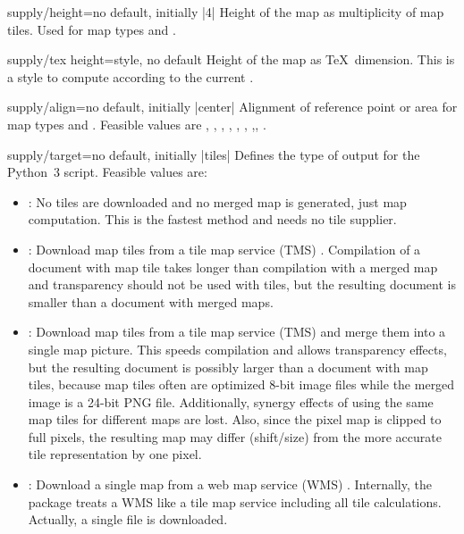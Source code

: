 \begin{docMrcKey}{supply/height}{=}{no default, initially |4|}
  Height of the map as multiplicity of map tiles.
  Used for map types  and .
\end{docMrcKey}

\begin{docMrcKey}{supply/tex height}{=}{style, no default}
  Height of the map as \TeX\ dimension.
  This is a style to compute  according to
  the current .
\end{docMrcKey}

\begin{docMrcKey}{supply/align}{=}{no default, initially |center|}
  Alignment of reference point or area for map types  and .
  Feasible values are
  , , , ,
  , , ,, .
\end{docMrcKey}

\begin{docMrcKey}{supply/target}{=}{no default, initially |tiles|}
  Defines the type of output for the Python~3 script. Feasible values are:
  \begin{itemize}
  \item{}: No tiles are downloaded and no merged map is generated, just map computation.
    This is the fastest method and needs no tile supplier.
  \item{}: Download map tiles from a tile map service (TMS) .
    Compilation of a document with map tile takes longer than compilation
    with a merged map and transparency should not be used with tiles,
    but the resulting document is smaller than a document with merged maps.
  \item{}: Download map tiles from a tile map service (TMS)
     and merge them into a single map picture.
    This speeds compilation and allows transparency effects, but
    the resulting document is possibly larger than a document with map tiles,
    because map tiles often are optimized 8-bit image files while the merged
    image is a 24-bit PNG file. Additionally, synergy effects of using the same map tiles
    for different maps are lost.
    Also, since the pixel map is clipped to full pixels, the resulting map
    may differ (shift/size) from the more accurate tile representation by
    one pixel.
  \item{}: Download a single map from a web map service (WMS)
    . Internally, the package treats a WMS like
    a tile map service including all tile calculations. Actually, a single
    file is downloaded.
  \end{itemize}
\end{docMrcKey}


